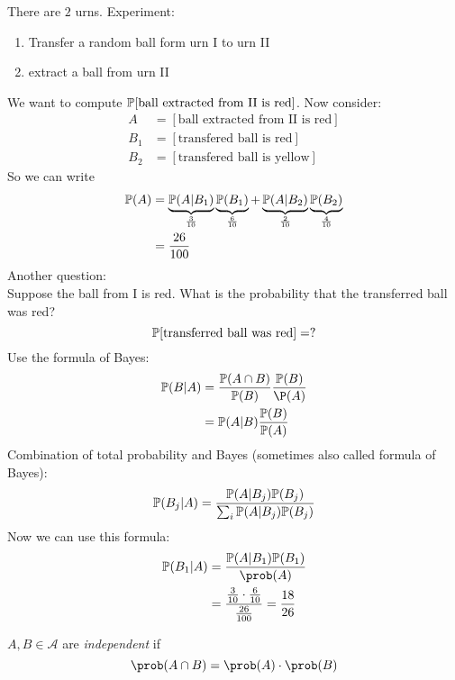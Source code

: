 \documentclass[mfit.tex]{subfiles}
\begin{document}
\begin{ex}
  There are $2$ urns.
  Experiment:
  \begin{enumerate}
    \item Transfer a random ball form urn I to urn II
    \item extract a ball from urn II
  \end{enumerate}
  We want to compute $\mathbb{P}[\text{ball extracted from II is red}]$.
  Now consider:
  \begin{align*}
    A &= [\text{ball extracted from II is red}] \\
    B_1 &= [\text{transfered ball is red}] \\
    B_2 &= [\text{transfered ball is yellow}]
  \end{align*}
  So we can write
  \begin{align*}
    \mathbb{P}(A) &= \underbrace{\mathbb{P}(A | B_1)}_{\frac{3}{10}} \underbrace{\mathbb{P}(B_1)}_{\frac{6}{10}} 
    + \underbrace{\mathbb{P}(A | B_2)}_{\frac{2}{10}} \underbrace{\mathbb{P}(B_2)}_{\frac{4}{10}} \\
    &= \frac{26}{100}
  \end{align*}
  Another question:\\
  Suppose the ball from I is red. What is the probability that the transferred ball was red?
  \[ \mathbb{P}[\text{transferred ball was red}] = ? \]
  Use the formula of Bayes:
  \begin{align*}
    \PP(B | A) &= \frac{\PP(A \cap B)}{\PP(B)} \frac{\PP(B)}{\P(A)} \\
    &= \PP(A | B) \frac{\PP(B)}{\PP(A)}
  \end{align*}
  Combination of total probability and Bayes (sometimes also called formula of Bayes):
  \begin{align*}
    \mathbb{P}(B_j | A) = \frac{\mathbb{P}(A | B_j) \mathbb{P}(B_j)}{\sum_{i} \mathbb{P}(A | B_j) \mathbb{P}(B_j)}
  \end{align*}
  Now we can use this formula:
  \begin{align*}
    \PP(B_1 | A) &= \frac{\PP(A | B_1) \PP(B_1)}{\prob(A)} \\
    &= \frac{\frac{3}{10} \cdot \frac{6}{10}}{\frac{26}{100}} = \frac{18}{26}
  \end{align*}
\end{ex}

\begin{defi*}
  $A,B \in \mathcal{A}$ are \emph{independent} if
  \[ \prob(A \cap B) = \prob(A) \cdot \prob(B) \]
\end{defi*}
\end{document}
